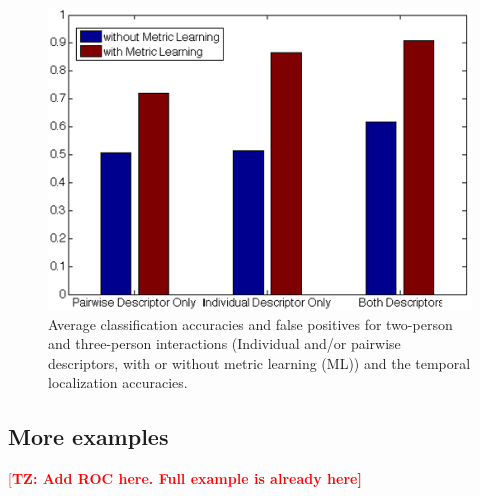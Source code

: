 \documentclass[10pt,twocolumn,letterpaper]{article}
\newcommand{\todd}[1]{\textcolor{red}{[\bf TZ: #1]}}
\begin{document}
\begin{figure}[t]
\begin{center}
\includegraphics[scale=2.5]{temporal_bar.png}
\end{center}
\caption{Average classification accuracies and false positives for two-person and three-person interactions (Individual and/or pairwise descriptors, with or without metric learning (ML)) and the temporal localization accuracies.}
\label{temporal_bar}
\end{figure}

\subsection{More examples}

\todd{Add ROC here. Full example is already here}
\end{document}

